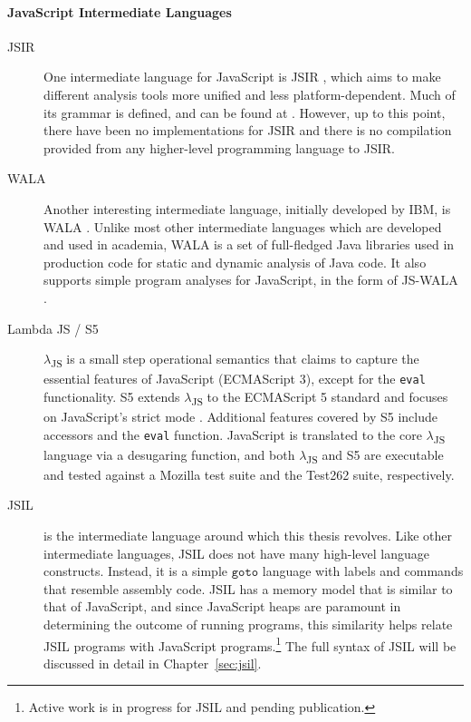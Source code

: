 \documentclass[a4paper,11pt,twoside]{report}
\begin{document}
\paragraph{JavaScript Intermediate Languages}
\begin{description}
\item[JSIR] One intermediate language for JavaScript is JSIR \cite{Livshits:2016:Misc}, which aims to make different analysis tools more unified and less platform-dependent. Much of its grammar is defined, and can be found at \cite{Livshits:2016:Misc}. However, up to this point, there have been no implementations for JSIR and there is no compilation provided from any higher-level programming language to JSIR.

\item[WALA] Another interesting intermediate language, initially developed by IBM, is WALA \cite{WALA}. Unlike most other intermediate languages which are developed and used in academia, WALA is a set of full-fledged Java libraries used in production code for static and dynamic analysis of Java code. It also supports simple program analyses for JavaScript, in the form of JS-WALA \cite{WALA2}.

\item[Lambda JS / S5] $\lambda$\textsubscript{JS} \cite{Guha:2010} is a small step operational semantics that claims to capture the essential features of JavaScript (ECMAScript 3), except for the \texttt{eval} functionality. S5 extends $\lambda$\textsubscript{JS} to the ECMAScript 5 standard and focuses on JavaScript's strict mode \cite{Politz:2012}. Additional features covered by S5 include accessors and the \texttt{eval} function. JavaScript is translated to the core $\lambda$\textsubscript{JS} language via a desugaring function, and both $\lambda$\textsubscript{JS} and S5 are executable and tested against a Mozilla test suite and the Test262 suite, respectively.

\item[JSIL] is the intermediate language around which this thesis revolves. Like other intermediate languages, JSIL does not have many high-level language constructs. Instead, it is a simple $\texttt{goto}$ language with labels and commands that resemble assembly code. JSIL has a memory model that is similar to that of JavaScript, and since JavaScript heaps are paramount in determining the outcome of running programs, this similarity helps relate JSIL programs with JavaScript programs.\footnote{Active work is in progress for JSIL and pending publication.} The full syntax of JSIL will be discussed in detail in Chapter~\ref{sec:jsil}.


\end{description}
\end{document}
